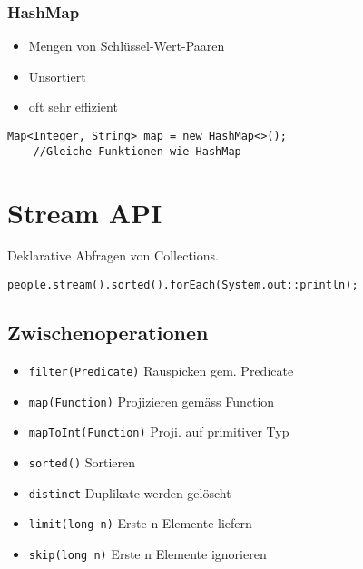 \begin{multicols*}{5}
		\subsubsection{HashMap}
		\begin{itemize}
			\item Mengen von Schlüssel-Wert-Paaren
			\item Unsortiert
			\item oft sehr effizient
		\end{itemize}
		\begin{lstlisting}
Map<Integer, String> map = new HashMap<>();
	//Gleiche Funktionen wie HashMap
		\end{lstlisting}



\columnbreak




\section{Stream API}
	Deklarative Abfragen von Collections.
	\begin{lstlisting}
people.stream().sorted().forEach(System.out::println);
	\end{lstlisting}
	\subsection{Zwischenoperationen}
		\begin{itemize}
			\item \tiny \textcolor{b}{\texttt{filter(Predicate)}}
				\footnotesize Rauspicken gem. Predicate
			\item \tiny \textcolor{b}{\texttt{map(Function)}}
				\footnotesize Projizieren gemäss Function
			\item \tiny \textcolor{b}{\texttt{mapToInt(Function)}}
				\footnotesize Proji. auf primitiver Typ
			\item \tiny \textcolor{b}{\texttt{sorted()}}
				\footnotesize Sortieren
			\item \tiny \textcolor{b}{\texttt{distinct}}
				\footnotesize Duplikate werden gelöscht
			\item \tiny \textcolor{b}{\texttt{limit(long n)}}
				\footnotesize Erste n Elemente liefern
			\item \tiny \textcolor{b}{\texttt{skip(long n)}}
				\footnotesize Erste n Elemente ignorieren
		\end{itemize}

\end{multicols*}
